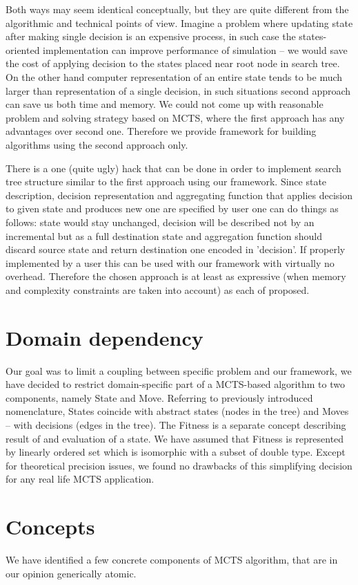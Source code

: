Both ways may seem identical conceptually, but they are quite different from
the algorithmic and technical points of view.
Imagine a problem where updating state after making single decision is an
expensive process, in such case the states-oriented implementation can improve
performance of simulation -- we would save the cost of applying decision to the
states placed near root node in search tree.
On the other hand computer representation of an entire state tends to be much
larger than representation of a single decision, in such situations second
approach can save us both time and memory.
We could not come up with reasonable problem and solving strategy based on
MCTS, where the first approach has any advantages over second one. Therefore we
provide framework for building algorithms using the second approach only.

There is a one (quite ugly) hack that can be done in order to implement search
tree structure similar to the first approach using our framework. Since state
description, decision representation and aggregating function that applies
decision to given state and produces new one are specified by user one can do
things as follows: state would stay unchanged, decision will be described not
by an incremental but as a full destination state and aggregation function
should discard source state and return destination one encoded in 'decision'.
If properly implemented by a user this can be used with our framework with
virtually no overhead. Therefore the chosen approach is at least as expressive
(when memory and complexity constraints are taken into account) as each of
proposed.

\section{Domain dependency}
Our goal was to limit a coupling between specific problem and our framework, we
have decided to restrict domain-specific part of a MCTS-based algorithm to two
components, namely State and Move. Referring to previously introduced
nomenclature, States coincide with abstract states (nodes in the tree) and
Moves -- with decisions (edges in the tree).
The Fitness is a separate concept describing result of and evaluation of a
state. We have assumed that Fitness is represented by linearly ordered set
which is isomorphic with a subset of double type. Except for theoretical
precision issues, we found no drawbacks of this simplifying decision for any
real life MCTS application.

\section{Concepts}
We have identified a few concrete components of MCTS algorithm, that are in our
opinion generically atomic.

